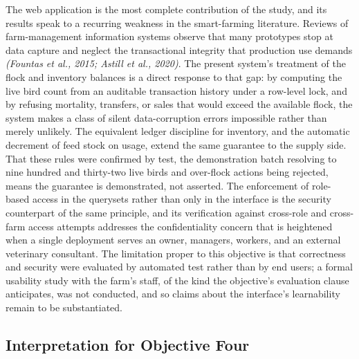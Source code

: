 \documentclass[12pt,a4paper]{report}
\begin{document}
The web application is the most complete contribution of the study, and its results speak to a recurring weakness in the smart-farming literature. Reviews of farm-management information systems observe that many prototypes stop at data capture and neglect the transactional integrity that production use demands \textit{(Fountas et al., 2015; Astill et al., 2020)}. The present system's treatment of the flock and inventory balances is a direct response to that gap: by computing the live bird count from an auditable transaction history under a row-level lock, and by refusing mortality, transfers, or sales that would exceed the available flock, the system makes a class of silent data-corruption errors impossible rather than merely unlikely. The equivalent ledger discipline for inventory, and the automatic decrement of feed stock on usage, extend the same guarantee to the supply side. That these rules were confirmed by test, the demonstration batch resolving to nine hundred and thirty-two live birds and over-flock actions being rejected, means the guarantee is demonstrated, not asserted. The enforcement of role-based access in the querysets rather than only in the interface is the security counterpart of the same principle, and its verification against cross-role and cross-farm access attempts addresses the confidentiality concern that is heightened when a single deployment serves an owner, managers, workers, and an external veterinary consultant. The limitation proper to this objective is that correctness and security were evaluated by automated test rather than by end users; a formal usability study with the farm's staff, of the kind the objective's evaluation clause anticipates, was not conducted, and so claims about the interface's learnability remain to be substantiated.

\subsection{Interpretation for Objective Four}
\end{document}
